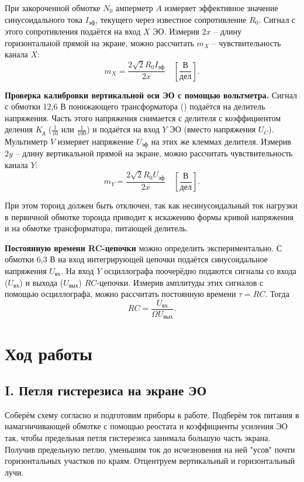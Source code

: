 \documentclass[a4paper,10pt]{article}
\begin{document}
При закороченной обмотке $N_0$ амперметр $A$ измеряет эффективное значение синусоидального тока $I_{\text{эф}}$, текущего через известное сопротивление $R_0$. Сигнал с этого сопротивления подаётся на вход $X$ ЭО. Измерив $2x$ -- длину горизонтальной прямой на экране, можно рассчитать $m_X$ -- чувствительность канала $X$:\[m_X=\frac{2\sqrt2R_0I_{\text{эф}}}{2x}\quad\left[\frac{\text{В}}{\text{дел}}\right].\]

\textbf{Проверка калибровки вертикальной оси ЭО с помощью вольтметра.} Сигнал с обмотки 12,6 В понижающего трансформатора () подаётся на делитель напряжения. Часть этого напряжения снимается с делителя с коэффициентом деления $K_{\text{д}}$ ($\frac{1}{10}$ или $\frac{1}{100}$) и подаётся на вход $Y$ ЭО (вместо напряжения $U_C$). Мультиметр $V$ измеряет напряжение $U_{\text{эф}}$ на этих же клеммах делителя. Измерив $2y$ -- длину вертикальной прямой на экране, можно рассчитать чувствительность канала $Y$:\[m_Y=\frac{2\sqrt2R_0U_{\text{эф}}}{2x}\quad\left[\frac{\text{В}}{\text{дел}}\right].\]

При этом тороид должен быть отключен, так как несинусоидальный ток нагрузки в первичной обмотке тороида приводит к искажению формы кривой напряжения и на обмотке трансформатора, питающей делитель.

\textbf{Постоянную времени RC-цепочки} можно определить экспериментально. С обмотки 6,3 В на вход интегрирующей цепочки подаётся синусоидальное напряжения $U_{\text{вх}}$. На вход $Y$ осциллографа поочерёдно подаются сигналы со входа ($U_{\text{вх}}$) и выхода ($U_{\text{вых}}$) $RC$-цепочки. Измерив амплитуды этих сигналов с помощью осциллографа, можно рассчитать постоянную времени $\tau=RC$. Тогда\[RC=\frac{U_{\text{вх}}}{\Omega U_{\text{вых}}}.\]

\section*{Ход работы}

\subsection*{I. Петля гистерезиса на экране ЭО}

Соберём схему согласно  и подготовим приборы к работе. Подберём ток питания в намагничивающей обмотке с помощью реостата и коэффициенты усиления ЭО так, чтобы предельная петля гистерезиса занимала большую часть экрана. Получив предельную петлю, уменьшим ток до исчезновения на ней "усов"  \text{--} почти горизонтальных участков по краям. Отцентруем вертикальный и горизонтальный лучи.
\end{document}
